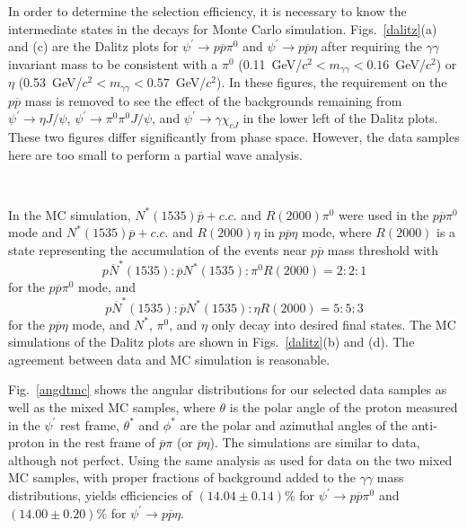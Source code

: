 \documentclass[prd,twocolumn,showpacs,amsmath,amssymb]{revtex4}
\newcommand{\psip}{\psi^\prime}
\newcommand{\jpsi}{J/\psi}
\newcommand{\chicJ}{\chi_{cJ}}
\newcommand{\piz}{\pi^0}
\newcommand{\ppb}{p\overline{p}}
\newcommand{\RR}{R(2000)}
\newcommand{\pspto}{\psi^\prime \rightarrow }
\newcommand{\g}{\gamma}
\begin{document}
In order to determine the selection efficiency, it is necessary to
know the intermediate states in the decays for Monte Carlo
simulation. Figs.~\ref{dalitz}(a) and (c) are the Dalitz plots for
$\pspto \ppb \piz$ and $\pspto \ppb \eta$ after requiring the
$\g\g$ invariant mass to be consistent with a $\piz$
(0.11~GeV/$c^2<m_{\g\g}<0.16$~GeV/$c^2$) or $\eta$
(0.53~GeV/$c^2<m_{\g\g}<0.57$~GeV/$c^2$). In these figures, the
requirement on the $\ppb$ mass is removed to see the effect of the
backgrounds remaining from $\pspto \eta \jpsi$, $\pspto \piz\piz
\jpsi$, and $\pspto \gamma \chicJ$ in the lower left of the Dalitz
plots. These two figures differ significantly from phase space.
However, the data samples here are too small to perform a partial
wave analysis.

\begin{figure*}[htbp]
\centerline{\hbox{
}} \caption{Dalitz
plots for $\pspto \ppb \piz$ and $\pspto \ppb\eta$. (a) and (b)
are for $\pspto \ppb \piz$ data and the mixed Monte Carlo sample,
respectively, and (c) and (d) are for $\pspto \ppb \eta$ data and
the mixed Monte Carlo sample, respectively.} \label{dalitz}
\end{figure*}

In the MC simulation, $N^*(1535)\overline{p}+c.c.$ and $\RR\piz$ were
used in the $\ppb\piz$ mode and $N^*(1535)\overline{p}+c.c.$ and
$\RR\eta$ in $\ppb\eta$ mode, where $\RR$ is a state representing the
accumulation of the events near $\ppb$ mass threshold with
$$p\overline{N}^*(1535):\overline{p}N^*(1535):\piz \RR=2:2:1$$
for the $\ppb \piz$ mode, and
$$p\overline{N}^*(1535):\overline{p}N^*(1535):\eta \RR=5:5:3$$
for the $\ppb \eta$ mode, and $N^*$, $\piz$, and $\eta$ only decay
into desired final states. The MC simulations of the Dalitz plots
are shown in Figs.~\ref{dalitz}(b) and (d). The agreement between
data and MC simulation is reasonable.

Fig.~\ref{angdtmc} shows the angular distributions for our
selected data samples as well as the mixed MC samples, where
$\theta$ is the polar angle of the proton measured in the $\psip$
rest frame, $\theta^*$ and $\phi^*$ are the polar and azimuthal
angles of the anti-proton in the rest frame of $\overline{p}\pi$
(or $\overline{p}\eta$). The simulations are similar to data,
although not perfect. Using the same analysis as used for data on
the two mixed MC samples, with proper fractions of background
added to the $\g\g$ mass distributions, yields efficiencies of
$(14.04\pm 0.14)\%$ for $\pspto \ppb \piz$ and $(14.00\pm 0.20)\%$
for $\pspto \ppb \eta$.
\end{document}
